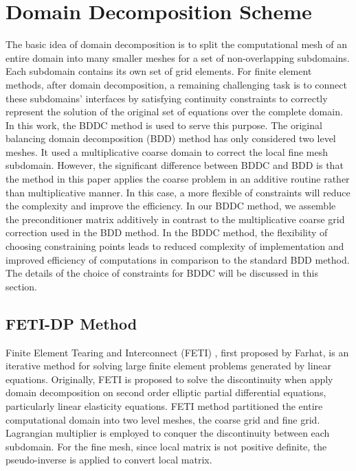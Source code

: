 \section{Domain Decomposition Scheme}
The basic idea of domain decomposition is to split the computational mesh of an entire domain into many smaller meshes for a set of non-overlapping subdomains. Each subdomain contains its own set of grid elements. For finite element methods, after domain decomposition, a remaining challenging task is to connect these subdomains' interfaces by satisfying continuity constraints to correctly represent the solution of the original set of equations over the complete domain. In this work, the BDDC method is used to serve this purpose. The original balancing domain decomposition (BDD) method \cite{mandel1993balancing} has only considered two level meshes. It used a multiplicative coarse domain to correct the local fine mesh subdomain. However, the significant difference between BDDC and BDD is that the method in this paper applies the coarse problem in an additive routine rather than multiplicative manner. In this case, a more flexible of constraints will reduce the complexity and improve the efficiency. In our BDDC method, we assemble the preconditioner matrix additively in contrast to the multiplicative coarse grid correction used in the BDD method. In the BDDC method, the flexibility of choosing constraining points leads to reduced complexity of implementation and improved efficiency of computations in comparison to the standard BDD method. The details of the choice of constraints for BDDC will be discussed in this section.

\subsection{FETI-DP Method}
Finite Element Tearing and Interconnect (FETI) , first proposed by Farhat\cite{farhat1991method, farhat1994optimal, klawonn2001feti, farhat1998two, li2006feti, klawonn2006dual}, is an iterative method for solving large finite element problems generated by linear equations. Originally, FETI is proposed to solve the discontinuity when apply domain decomposition on second order elliptic partial differential equations, particularly linear elasticity equations. FETI method partitioned the entire computational domain into two level meshes, the coarse grid and fine grid. Lagrangian multiplier is employed to conquer the discontinuity between each subdomain. For the fine mesh, since local matrix is not positive definite, the pseudo-inverse is applied to convert local matrix. 

